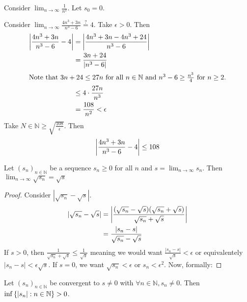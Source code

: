 \documentclass[../notes.tex]{subfiles}
\begin{document}
\begin{example}
	Consider $\lim_{n\to \infty} \frac{1}{n^2}$. Let $s_0 = 0$.
\end{example}

\begin{example}
	Consider $\lim_{n \to \infty} \frac{4n^3 + 3n}{n^3 - 6} \overset{?}{=} 4$. Take $\epsilon > 0$. Then
	\begin{align*}
		\qty|\frac{4n^3 + 3n}{n^3 - 6} - 4| &= \qty|\frac{4n^3 + 3n - 4n^3 + 24}{n^3 - 6}| \\
											&= \frac{3n + 24}{\qty|n^3 - 6|} \\
											\intertext{Note that $3n + 24 \leq 27n$ for all $n \in \mathbb{N}$ and $n^3 - 6 \geq \frac{n^3}{4}$ for $n \geq 2$.}
											&\leq 4 \cdot \frac{27n}{n^3} \\
											&= \frac{108}{n^2} < \epsilon
	\end{align*}
	Take $N \in \mathbb{N} \geq \sqrt{\frac{108}{\epsilon}}$. Then
	\[
		\qty|\frac{4n^3 + 3n}{n^3 - 6} - 4| \leq 108
	\]
\end{example}

\begin{theorem}
	Let $(s_n)_{n\in \mathbb{N}}$ be a sequence $s_n \geq 0$ for all $n$ and $s = \lim_{n\to \infty} s_n$. Then $\lim_{n\to \infty} \sqrt{s_n} = \sqrt{s}$
\end{theorem}

\begin{proof}
	Consider $|\sqrt{s_n} - \sqrt{s}|$.
	\begin{align*}
		|\sqrt{s_n} - \sqrt{s}| &= \qty|\frac{(\sqrt{s_n} - \sqrt{s})(\sqrt{s_n} + \sqrt{s})}{\sqrt{s_n} + \sqrt{s}}| \\
								&= \frac{\qty|s_n - s|}{\sqrt{s_n} - \sqrt{s}}
	\end{align*}
	If $s > 0$, then $\frac{1}{\sqrt{s_n} + \sqrt{s}} \leq \frac{1}{\sqrt{s}}$ meaning we would want $\frac{|s_n - s|}{\sqrt{s}} < \epsilon$ or equivalentely $|s_n - s| < \epsilon\sqrt{s}$. If $s = 0$, we want $\sqrt{s_n} < \epsilon$ or $s_n < \epsilon^2$. Now, formally:


\end{proof}

\begin{theorem}
	Let $(s_n)_{n\in \mathbb{N}}$ be convergent to $s \neq 0$ with $\forall n \in \mathbb{N}, s_n \neq 0$. Then $\inf\qty{|s_n| : n \in \mathbb{N}} > 0$.
\end{theorem}
\end{document}
